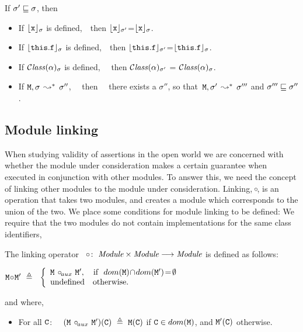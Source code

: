 \begin{lemma}
If $\sigma'  \sqsubseteq \sigma$, then

\begin{itemize}
\item
If ${\lfloor{ {{\mbox{\tt{x}}}}}\rfloor_{\sigma}}$ is defined,\ \  then ${\lfloor{ {{\mbox{\tt{x}}}}}\rfloor_{\sigma'}}$=${\lfloor{ {{\mbox{\tt{x}}}}}\rfloor_{\sigma}}$.
\item
If ${\lfloor{ {{\mbox{\tt{this}}}.{\mbox{\tt{f}}}}}\rfloor_{\sigma}}$ is defined,\ \  then ${\lfloor{ {{\mbox{\tt{this}}}.{\mbox{\tt{f}}}}}\rfloor_{\sigma'}}$=${\lfloor{ {{\mbox{\tt{this}}}.{\mbox{\tt{f}}}}}\rfloor_{\sigma}}$.
\item
If ${\mathcal C}{\mathit{lass}}(\alpha)_{\sigma} $  is defined, \ \ then  ${\mathcal C}{\mathit{lass}}(\alpha)_{\sigma'} $  = ${\mathcal C}{\mathit{lass}}(\alpha)_{\sigma} $.
\item
If ${\mbox{\tt{\ensuremath{{\mbox{\tt{M}}}}}}}, \sigma \, \leadsto^*\, \sigma''$, \ \  then     \ \ there exists a $\sigma''$, so that\ ${\mbox{\tt{\ensuremath{{\mbox{\tt{M}}}}}}}, \sigma'\, \leadsto^*\, \sigma'''$
and $\sigma''' \sqsubseteq \sigma''$.
\end{itemize}
\end{lemma}




\subsection{Module linking}

When studying validity of assertions in the open world we are concerned with whether   the  module
under consideration makes  a certain guarantee when executed in conjunction with other modules. To answer this, we
 need the concept of linking other modules to the module  under consideration.
 Linking, $\!\circ\!$,  is an operation that takes two modules, and creates a module which corresponds  to the union of the two.
We place some conditions for module linking to be defined: We require that the two modules do not contain implementations for the same class identifiers,

\begin{definition}

The linking operator\  \ $\!\circ\!:\  {\mbox{\tt{{\it Module}}}} \times  {\mbox{\tt{{\it Module}}}} \longrightarrow {\mbox{\tt{{\it Module}}}}$ is defined as follows:

$
\M \link \M{'}  \ \triangleq  \ \ \left\{
\begin{array}{l}
                        \M\ \link\!_{aux}\ \M{'},\ \ \   \hbox{if}\  \ dom(\M)\!\cap\!dom(\M')\!=\!\emptyset\\
\mbox{undefined}  \ \ \ \mbox{otherwise.}
\end{array}
                    \right.$

and where,
\begin{itemize}
     \item
   For all  ${\mbox{\tt{C}}}$: \ \
   $(\M\ \link\!_{aux}\ \M')(\prg{C})\  \triangleq  \ \M(\prg{C})$  if  ${\mbox{\tt{C}}}\in dom({\mbox{\tt{\ensuremath{{\mbox{\tt{M}}}}}}})$, and  ${\mbox{\tt{\ensuremath{{\mbox{\tt{M}}}}}}}'({\mbox{\tt{C}}})$ otherwise.
 \end{itemize}
\end{definition}


